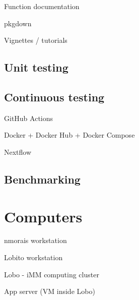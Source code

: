 Function documentation

pkgdown

Vignettes / tutorials

\subsection{Unit testing}

\subsection{Continuous testing}

GitHub Actions

Docker + Docker Hub + Docker Compose

Nextflow

\subsection{Benchmarking}

\section{Computers}

nmorais workstation

Lobito workstation

Lobo - iMM computing cluster

App server (VM inside Lobo)
